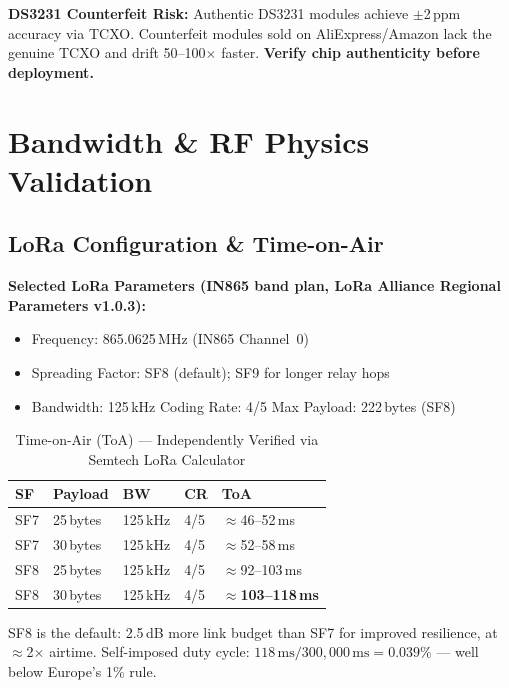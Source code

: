 \documentclass[12pt,a4paper]{article}
\begin{document}
\begin{warnbox}
\textbf{DS3231 Counterfeit Risk:} Authentic DS3231 modules achieve $\pm$2\,ppm accuracy via TCXO. Counterfeit modules sold on AliExpress/Amazon lack the genuine TCXO and drift 50--100$\times$ faster. \textbf{Verify chip authenticity before deployment.}
\end{warnbox}

\section{Bandwidth \& RF Physics Validation}

\subsection{LoRa Configuration \& Time-on-Air}

\textbf{Selected LoRa Parameters (IN865 band plan, LoRa Alliance Regional Parameters v1.0.3):}
\begin{itemize}
    \item Frequency: 865.0625\,MHz (IN865 Channel~0)
    \item Spreading Factor: SF8 (default); SF9 for longer relay hops
    \item Bandwidth: 125\,kHz \quad Coding Rate: 4/5 \quad Max Payload: 222\,bytes (SF8)
\end{itemize}

\begin{table}[h!]
\centering
\caption{Time-on-Air (ToA) --- Independently Verified via Semtech LoRa Calculator}
\begin{tabular}{C{2.5cm} C{2.5cm} C{2cm} C{2cm} C{2cm}}
\toprule
\textbf{SF} & \textbf{Payload} & \textbf{BW} & \textbf{CR} & \textbf{ToA} \\
\midrule
SF7 & 25\,bytes & 125\,kHz & 4/5 & $\approx$46--52\,ms \\
SF7 & 30\,bytes & 125\,kHz & 4/5 & $\approx$52--58\,ms \\
SF8 & 25\,bytes & 125\,kHz & 4/5 & $\approx$92--103\,ms \\
SF8 & 30\,bytes & 125\,kHz & 4/5 & \textbf{$\approx$103--118\,ms} \\
\bottomrule
\end{tabular}
\end{table}

SF8 is the default: 2.5\,dB more link budget than SF7 for improved resilience, at $\approx$2$\times$ airtime. Self-imposed duty cycle: $118\,\text{ms} / 300{,}000\,\text{ms} = \mathbf{0.039\%}$ --- well below Europe's 1\% rule.
\end{document}
